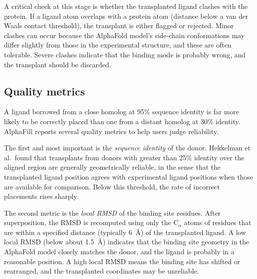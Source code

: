 A critical check at this stage is whether the transplanted ligand clashes with the protein. If a ligand atom overlaps with a protein atom (distance below a van der Waals contact threshold), the transplant is either flagged or rejected. Minor clashes can occur because the AlphaFold model's side-chain conformations may differ slightly from those in the experimental structure, and these are often tolerable. Severe clashes indicate that the binding mode is probably wrong, and the transplant should be discarded.

\subsection{Quality metrics}
\label{sec:quality-metrics}

 A ligand borrowed from a close homolog at 95\% sequence identity is far more likely to be correctly placed than one from a distant homolog at 30\% identity. AlphaFill reports several quality metrics to help users judge reliability.

The first and most important is the \emph{sequence identity} of the donor. Hekkelman et al.\ found that transplants from donors with greater than 25\% identity over the aligned region are generally geometrically reliable, in the sense that the transplanted ligand position agrees with experimental ligand positions when those are available for comparison. Below this threshold, the rate of incorrect placements rises sharply.

The second metric is the \emph{local RMSD} of the binding site residues. After superposition, the RMSD is recomputed using only the C$_\alpha$ atoms of residues that are within a specified distance (typically 6~\AA) of the transplanted ligand. A low local RMSD (below about 1.5~\AA) indicates that the binding site geometry in the AlphaFold model closely matches the donor, and the ligand is probably in a reasonable position. A high local RMSD means the binding site has shifted or rearranged, and the transplanted coordinates may be unreliable.

